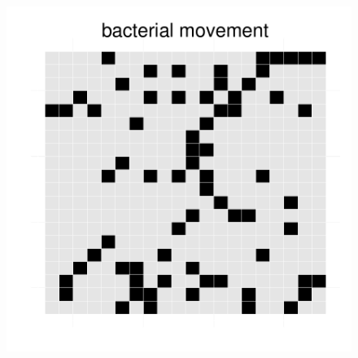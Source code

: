 \begin{figure}[h!]
{\begin{minipage}[t]{0.3\textwidth}
  \end{minipage}
  \begin{minipage}[t]{0.3\textwidth}
      \includegraphics[width=\textwidth]{../results/barkeri_20x20_seed9659_bac100.pdf}
  \end{minipage}
  }
\end{figure}
